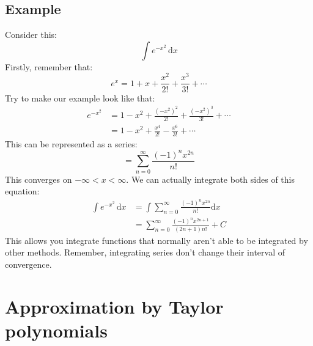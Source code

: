 \documentclass{report}
\begin{document}
    \subsection{Example}
        Consider this:
        \[\int e^{-x^2} \,\mathrm{d}x \]
        Firstly, remember that:
        \[e^x = 1 + x + \frac{x^2}{2!} + \frac{x^3}{3!} + \cdots\]
        Try to make our example look like that:
        \begin{align*}
            e^{-x^2} &= 1 - x^2 + \frac{(-x^2)^2}{2!} + \frac{(-x^2)^3}{3!} + \cdots \\
            &= 1 - x^2 + \frac{x^4}{2!} - \frac{x^6}{3!} + \cdots
        \end{align*}
        This can be represented as a series:
        \[= \sum_{n=0}^{\infty} \frac{(-1)^n x^{2n}}{n!}\]
        This converges on \(- \infty < x < \infty\).
        We can actually integrate both sides of this equation:
        \begin{align*}
            \int e^{-x^2} \,\mathrm{d}x &= \int \sum_{n=0}^{\infty} \frac{(-1)^n x^{2n}}{n!} \mathrm{d}x \\
            &= \sum_{n=0}^{\infty} \frac{(-1)^n x^{2n+1}}{(2n+1)n!} + C
        \end{align*}
        This allows you integrate functions that normally aren't able to be integrated by other methods.
        Remember, integrating series don't change their interval of convergence.

\newpage
\section{Approximation by Taylor polynomials}
    
\end{document}
